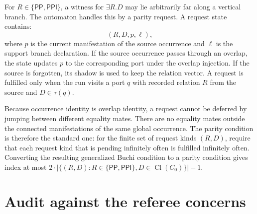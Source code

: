 \documentclass[11pt]{article}
\newcommand{\PP}{\mathsf{PP}}
\newcommand{\PPI}{\mathsf{PPI}}
\newcommand{\Cl}{\operatorname{Cl}}
\begin{document}
For $R\in\{\PP,\PPI\}$, a witness for $\exists R.D$ may lie arbitrarily far along a
vertical branch.  The automaton handles this by a parity request.  A request state
contains:
\[
  (R,D,p,\ell),
\]
where $p$ is the current manifestation of the source occurrence and $\ell$ is the support
branch declaration.  If the source occurrence passes through an overlap, the state updates
$p$ to the corresponding port under the overlap injection.  If the source is forgotten,
its shadow is used to keep the relation vector.  A request is fulfilled only when the run
visits a port $q$ with recorded relation $R$ from the source and $D\in\tau(q)$.

Because occurrence identity is overlap identity, a request cannot be deferred by jumping
between different equality mates.  There are no equality mates outside the connected
manifestations of the same global occurrence.  The parity condition is therefore the
standard one: for the finite set of request kinds $(R,D)$, require that each request kind
that is pending infinitely often is fulfilled infinitely often.  Converting the resulting
generalized Buchi condition to a parity condition gives index at most
$2\cdot |\{(R,D):R\in\{\PP,\PPI\},D\in\Cl(C_0)\}|+1$.


\section{Audit against the referee concerns}
\end{document}
